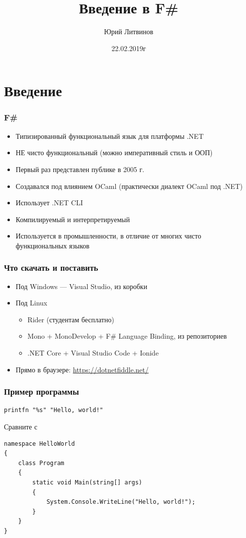\documentclass[xetex,mathserif,serif]{beamer}
\title{Введение в F\#}
\author{Юрий Литвинов}
\date{22.02.2019г}
\begin{document}
	
	\frame{\titlepage}
	
	\section{Введение}
	
	\begin{frame}
		\frametitle{F\#}
		\begin{itemize}
			\item Типизированный функциональный язык для платформы .NET
			\item НЕ чисто функциональный (можно императивный стиль и ООП)
			\item Первый раз представлен публике в 2005 г.
			\item Создавался под влиянием OCaml (практически диалект OCaml под .NET)
			\item Использует .NET CLI
			\item Компилируемый и интерпретируемый
			\item Используется в промышленности, в отличие от многих чисто функциональных языков
		\end{itemize}
	\end{frame}

	\begin{frame}
		\frametitle{Что скачать и поставить}
		\begin{itemize}
			\item Под Windows --- Visual Studio, из коробки
			\item Под Linux
			\begin{itemize}
				\item Rider (студентам бесплатно)
				\item Mono + MonoDevelop + F\# Language Binding, из репозиториев
				\item .NET Core + Visual Studio Code + Ionide
			\end{itemize}
			\item Прямо в браузере: \url{https://dotnetfiddle.net/}
		\end{itemize}
	\end{frame}
	
	\begin{frame}[fragile]
		\frametitle{Пример программы}
		\begin{verbatim}
printfn "%s" "Hello, world!"
		\end{verbatim}
		Сравните с
		\begin{verbatim}
namespace HelloWorld
{
    class Program
    {
        static void Main(string[] args)
        {
            System.Console.WriteLine("Hello, world!");
        }
    }
}
		\end{verbatim}
	\end{frame}
\end{document}
